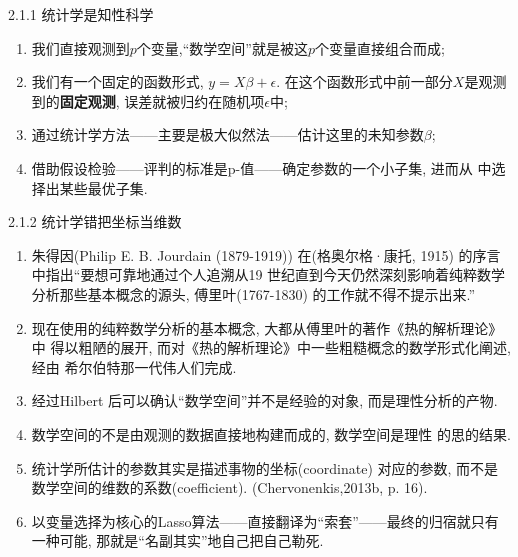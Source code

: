 \documentclass[compress,10pt,dvipsnames,notheorems]{beamer} %
\begin{document}
\begin{frame}{2.1.1 统计学是知性科学}
\begin{solu}
\begin{enumerate}
\item 我们直接观测到$p$个变量,“数学空间”就是被这$p$个变量直接组合而成;
\item 我们有一个固定的函数形式, $y = X\beta + \epsilon$. 在这个函数形式中前一部分$X$是观测到的\textbf{固定观测}, 误差就被归约在随机项$\epsilon$中;
\item 通过统计学方法——主要是极大似然法——估计这里的未知参数$\beta$;
\item 借助假设检验——评判的标准是p-值——确定参数的一个小子集, 进而从
中选择出某些最优子集.
\end{enumerate}
\end{solu}

{\color{red}{以上的这些叙述是当前几乎所有统计学教科书的标本, 至于其他的内容都完全可以沿着此方向技术性地展开.}}

{\color{blue}{一句话: 统计学就是从天上掉下来的学问, 并且就是头脑先着地. 我们需要通过阐述统计学习理论, 让这门学问本身真正正立过来, 从地上升到天上去.}}
\end{frame}


\begin{frame}{2.1.2 统计学错把坐标当维数}
\begin{solu}
\begin{enumerate}
\item 朱得因(Philip E. B. Jourdain (1879-1919)) 在(格奥尔格·康托, 1915) 的序言中指出“要想可靠地通过个人追溯从19 世纪直到今天仍然深刻影响着纯粹数学分析那些基本概念的源头, 傅里叶(1767-1830) 的工作就不得不提示出来.”
\item 现在使用的纯粹数学分析的基本概念, 大都从傅里叶的著作《热的解析理论》中
得以粗陋的展开, 而对《热的解析理论》中一些粗糙概念的数学形式化阐述, 经由
希尔伯特那一代伟人们完成.
\item 经过Hilbert 后可以确认“数学空间”并不是经验的对象, 而是理性分析的产物.
\item 数学空间的不是由观测的数据直接地构建而成的, 数学空间是理性
的思的结果.
\item 统计学所估计的参数其实是描述事物的坐标(coordinate) 对应的参数, 而不是数学空间的维数的系数(coefficient). (Chervonenkis,2013b, p. 16).
\item 以变量选择为核心的Lasso算法——直接翻译为“索套”——最终的归宿就只有一种可能, 那就是“名副其实”地自己把自己勒死.
\end{enumerate}
\end{solu}
\end{frame}
\end{document}
